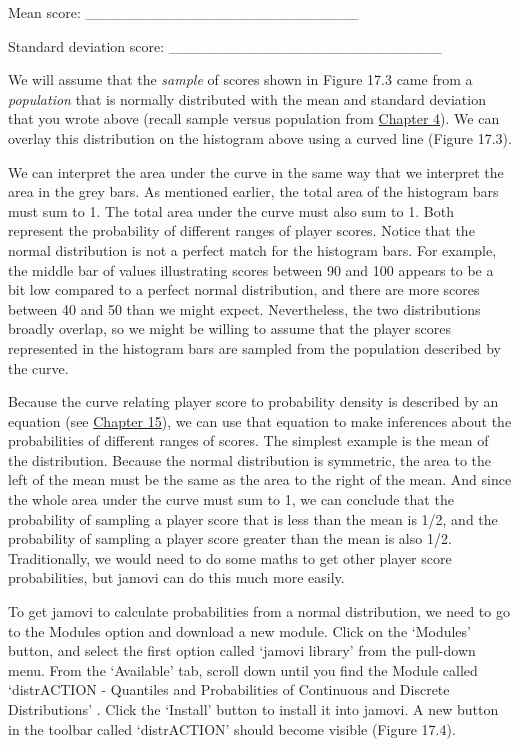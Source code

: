 \documentclass[
  openany]{krantz}
\begin{document}
Mean score: \_\_\_\_\_\_\_\_\_\_\_\_\_\_\_\_\_\_\_\_\_\_\_\_\_\_

Standard deviation score: \_\_\_\_\_\_\_\_\_\_\_\_\_\_\_\_\_\_\_\_\_\_\_\_\_\_

We will assume that the \emph{sample} of scores shown in Figure 17.3 came from a \emph{population} that is normally distributed with the mean and standard deviation that you wrote above (recall sample versus population from \protect\hyperlink{Chapter_4}{Chapter 4}).
We can overlay this distribution on the histogram above using a curved line (Figure 17.3).

We can interpret the area under the curve in the same way that we interpret the area in the grey bars.
As mentioned earlier, the total area of the histogram bars must sum to 1.
The total area under the curve must also sum to 1.
Both represent the probability of different ranges of player scores.
Notice that the normal distribution is not a perfect match for the histogram bars.
For example, the middle bar of values illustrating scores between 90 and 100 appears to be a bit low compared to a perfect normal distribution, and there are more scores between 40 and 50 than we might expect.
Nevertheless, the two distributions broadly overlap, so we might be willing to assume that the player scores represented in the histogram bars are sampled from the population described by the curve.

Because the curve relating player score to probability density is described by an equation (see \protect\hyperlink{Chapter_15}{Chapter 15}), we can use that equation to make inferences about the probabilities of different ranges of scores.
The simplest example is the mean of the distribution.
Because the normal distribution is symmetric, the area to the left of the mean must be the same as the area to the right of the mean.
And since the whole area under the curve must sum to 1, we can conclude that the probability of sampling a player score that is less than the mean is 1/2, and the probability of sampling a player score greater than the mean is also 1/2.
Traditionally, we would need to do some maths to get other player score probabilities, but jamovi can do this much more easily.

To get jamovi to calculate probabilities from a normal distribution, we need to go to the Modules option and download a new module.
Click on the `Modules' button, and select the first option called `jamovi library' from the pull-down menu.
From the `Available' tab, scroll down until you find the Module called `distrACTION - Quantiles and Probabilities of Continuous and Discrete Distributions' \citep{Rihs2018}.
Click the `Install' button to install it into jamovi.
A new button in the toolbar called `distrACTION' should become visible (Figure 17.4).
\end{document}
